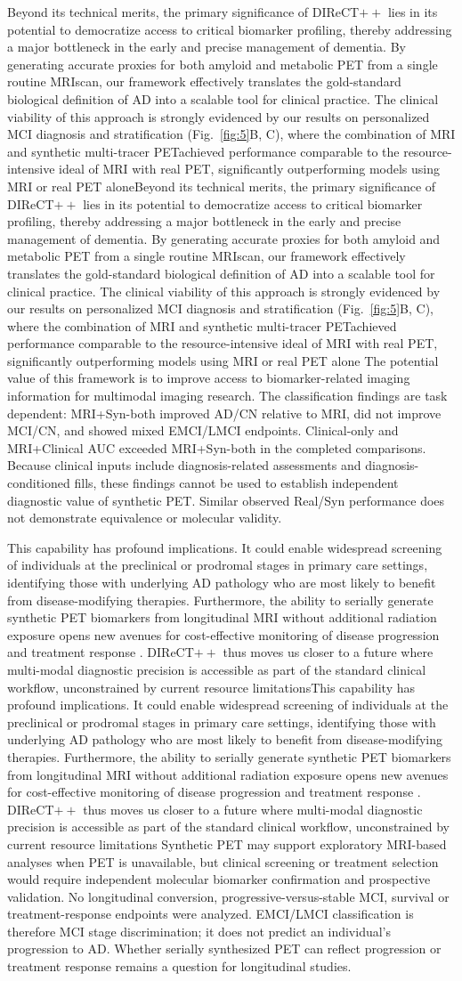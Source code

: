 \documentclass{article}
\providecommand{\DIFaddtex}[1]{{\protect\color{blue} \sf #1}} %
\providecommand{\DIFdeltex}[1]{{\protect\color{red} \ifmmode #1\else\scriptsize #1\fi}} %
\providecommand{\DIFaddbegin}{} %
\providecommand{\DIFaddend}{} %
\providecommand{\DIFdelbegin}{} %
\providecommand{\DIFdelend}{} %
\providecommand{\DIFadd}[1]{\texorpdfstring{\DIFaddtex{#1}}{#1}} %
\providecommand{\DIFdel}[1]{\texorpdfstring{\DIFdeltex{#1}}{}} %
\newcommand{\DIFscaledelfig}{0.5}
\newlength{\DIFdelgraphicswidth} %
\newlength{\DIFdelgraphicsheight} %
\newcommand{\DIFaddincludegraphics}[2][]{{\color{blue}\fbox{\DIFOincludegraphics[#1]{#2}}}} %
\newcommand{\DIFdelincludegraphics}[2][]{%
\sbox{\DIFdelgraphicsbox}{\DIFOincludegraphics[#1]{#2}}%
\settoboxwidth{\DIFdelgraphicswidth}{\DIFdelgraphicsbox} %
\settoboxtotalheight{\DIFdelgraphicsheight}{\DIFdelgraphicsbox} %
\scalebox{\DIFscaledelfig}{%
\parbox[b]{\DIFdelgraphicswidth}{\usebox{\DIFdelgraphicsbox}\\[-\baselineskip] \rule{\DIFdelgraphicswidth}{0em}}\llap{\resizebox{\DIFdelgraphicswidth}{\DIFdelgraphicsheight}{%
\setlength{\unitlength}{\DIFdelgraphicswidth}%
\begin{picture}(1,1)%
\thicklines\linethickness{2pt} %
{\color[rgb]{1,0,0}\put(0,0){\framebox(1,1){}}}%
{\color[rgb]{1,0,0}\put(0,0){\line( 1,1){1}}}%
{\color[rgb]{1,0,0}\put(0,1){\line(1,-1){1}}}%
\end{picture}%
}\hspace*{3pt}}} %
} %
\DeclareRobustCommand{\DIFaddbegin}{\DIFOaddbegin \let\includegraphics\DIFaddincludegraphics} %
\DeclareRobustCommand{\DIFaddend}{\DIFOaddend \let\includegraphics\DIFOincludegraphics} %
\DeclareRobustCommand{\DIFdelbegin}{\DIFOdelbegin \let\includegraphics\DIFdelincludegraphics} %
\DeclareRobustCommand{\DIFdelend}{\DIFOaddend \let\includegraphics\DIFOincludegraphics} %
\begin{document}
\DIFdelbegin \DIFdel{Beyond its technical merits, the primary significance of DIReCT$++$ lies in its potential to democratize access to critical biomarker profiling, thereby addressing a major bottleneck in the early and precise management of dementia. By generating accurate proxies for both amyloid and metabolic PET from a single routine MRIscan, our framework effectively translates the gold-standard biological definition of AD into a scalable tool for clinical practice. The clinical viability of this approach is strongly evidenced by our results on personalized MCI diagnosis and stratification (Fig.~\ref{fig:5}B, C), where the combination of MRI and synthetic multi-tracer PETachieved performance comparable to the resource-intensive ideal of MRI with real PET, significantly outperforming models using MRI or real PET alone}\DIFdelend \DIFaddbegin \DIFadd{The potential value of this framework is to improve access to biomarker-related imaging information for multimodal imaging research. The classification findings are task dependent: MRI+Syn-both improved AD/CN relative to MRI, did not improve MCI/CN, and showed mixed EMCI/LMCI endpoints. Clinical-only and MRI+Clinical AUC exceeded MRI+Syn-both in the completed comparisons. Because clinical inputs include diagnosis-related assessments and diagnosis-conditioned fills, these findings cannot be used to establish independent diagnostic value of synthetic PET. Similar observed Real/Syn performance does not demonstrate equivalence or molecular validity}\DIFaddend .

\DIFdelbegin \DIFdel{This capability has profound implications. It could enable widespread screening of individuals at the preclinical or prodromal stages in primary care settings, identifying those with underlying AD pathology who are most likely to benefit from disease-modifying therapies. Furthermore, the ability to serially generate synthetic PET biomarkers from longitudinal MRI without additional radiation exposure opens new avenues for cost-effective monitoring of disease progression and treatment response . DIReCT$++$ thus moves us closer to a future where multi-modal diagnostic precision is accessible as part of the standard clinical workflow, unconstrained by current resource limitations}\DIFdelend \DIFaddbegin \DIFadd{Synthetic PET may support exploratory MRI-based analyses when PET is unavailable, but clinical screening or treatment selection would require independent molecular biomarker confirmation and prospective validation. No longitudinal conversion, progressive-versus-stable MCI, survival or treatment-response endpoints were analyzed. EMCI/LMCI classification is therefore MCI stage discrimination; it does not predict an individual's progression to AD. Whether serially synthesized PET can reflect progression or treatment response remains a question for longitudinal studies}\DIFaddend .
\end{document}
